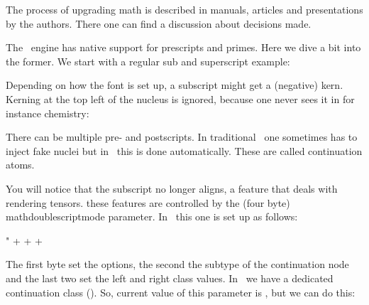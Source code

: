 The process of upgrading math is described in manuals, articles and presentations
by the authors. There one can find a discussion about decisions made.

\stopsection

\startsection[title={Scripts}]

\startbuffer[show:3]
\startlinecorrection[blank]
    \scale[s=3]\bgroup
        \switchtobodyfont[modern]%
        \getbuffer
    \egroup
\stoplinecorrection
\stopbuffer

The \LUAMETATEX\ engine has native support for prescripts and primes. Here we
dive a bit into the former. We start with a regular sub and superscript example:

\startbuffer
{}
\stopbuffer

\typebuffer \getbuffer[show:3]

Depending on how the font is set up, a subscript might get a (negative) kern.
Kerning at the top left of the nucleus is ignored, because one never sees it in
for instance chemistry:

\startbuffer
{}
\stopbuffer

\typebuffer \getbuffer[show:3]

There can be multiple pre- and postscripts. In traditional \TEX\ one sometimes
has to inject fake nuclei but in \LUAMETATEX\ this is done automatically. These
are called continuation atoms.

\startbuffer
{} \quad
{}
\stopbuffer

\typebuffer \getbuffer[show:3]

You will notice that the subscript no longer aligns, a feature that deals with
rendering tensors. these features are controlled by the (four byte) \prm
{mathdoublescriptmode} parameter. In \CONTEXT\ this one is set up as follows:

\starttyping
\mathdoublescriptmode
  "\tohexadecimal\numexpr
     \inheritclassdoublescriptmodecode
   + \discardshapekerndoublescriptmodecode
   + \realignscriptsdoublescriptmodecode
   + \reorderprescriptsdoublescriptmodecode
   \relax
   \tohexadecimal\mathcontinuationcode %
   \tohexadecimal\mathcontinuationcode %
   \tohexadecimal\mathcontinuationcode %
\stoptyping

The first byte set the options, the second the subtype of the continuation node
and the last two set the left and right class values. In \CONTEXT\ we have a
dedicated continuation class (). So,
current value of this parameter is ,
but we can do this:

